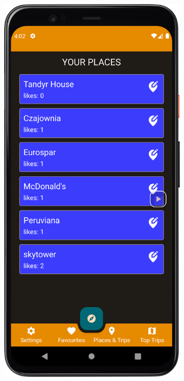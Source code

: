         \vspace{1cm}
        \begin{figure}[H]
            \centering
            \begin{subfigure}[b]{0.3\textwidth}
                \centering
                \includegraphics[width=\textwidth]{src/app/user_places.png}

\end{subfigure}
\end{figure}
